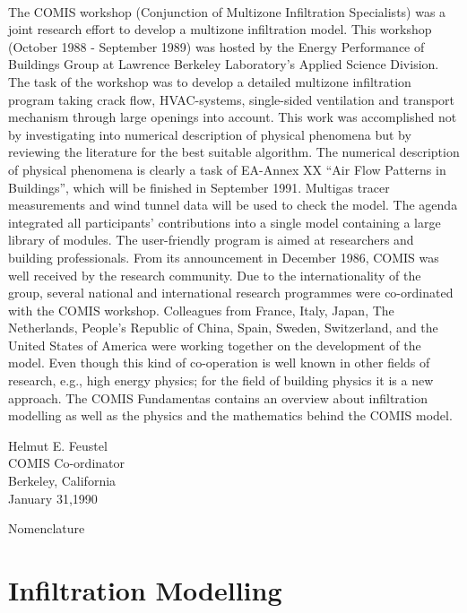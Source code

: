 \documentclass[12pt]{report}
\begin{document}
\newpage
{}\\
\noindent
The COMIS workshop (Conjunction of Multizone Infiltration Specialists) was a
joint research effort to develop a multizone infiltration model. This workshop
(October 1988 - September 1989) was hosted by the Energy Performance of
Buildings Group at Lawrence Berkeley Laboratory's Applied Science Division.
The task of the workshop was to develop a detailed multizone infiltration program
taking crack flow, HVAC-systems, single-sided ventilation and transport mechanism through large openings into account. This work was accomplished not by
investigating into numerical description of physical phenomena but by reviewing
the literature for the best suitable algorithm. The numerical description of physical phenomena is clearly a task of EA-Annex XX ``Air Flow Patterns in Buildings'', which will be finished in September 1991. Multigas tracer measurements
and wind tunnel data will be used to check the model. The agenda integrated all
participants' contributions into a single model containing a large library of
modules. The user-friendly program is aimed at researchers and building professionals.
From its announcement in December 1986, COMIS was well received by the
research community. Due to the internationality of the group, several national
and international research programmes were co-ordinated with the COMIS
workshop. Colleagues from France, Italy, Japan, The Netherlands, People's
Republic of China, Spain, Sweden, Switzerland, and the United States of America
were working together on the development of the model.
Even though this kind of co-operation is well known in other fields of research,
e.g., high energy physics; for the field of building physics it is a new approach.
The COMIS Fundamentas contains an overview about infiltration modelling as
well as the physics and the mathematics behind the COMIS model.

\begin{flushleft}
Helmut E. Feustel\\
COMIS Co-ordinator\\
Berkeley, California\\
January 31,1990\\
\end{flushleft}

\newpage
\begin{center}
\end{center}
\tableofcontents

Nomenclature
\chapter{Infiltration Modelling}
\end{document}
